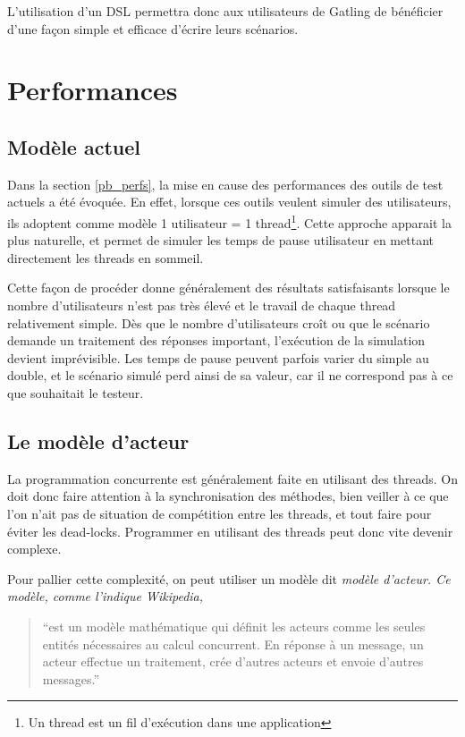 L'utilisation d'un DSL permettra donc aux utilisateurs de Gatling de bénéficier d'une façon simple et efficace d'écrire leurs scénarios.

\section{Performances}
\subsection{Modèle actuel}
Dans la section \ref{pb_perfs}, la mise en cause des performances des outils de test actuels a été évoquée. En effet, lorsque ces outils veulent simuler des utilisateurs, ils adoptent comme modèle 1 utilisateur = 1 thread\footnote{Un thread est un fil d'exécution dans une application}. Cette approche apparait la plus naturelle, et permet de simuler les temps de pause utilisateur en mettant directement les threads en sommeil.

Cette façon de procéder donne généralement des résultats satisfaisants lorsque le nombre d'utilisateurs n'est pas très élevé et le travail de chaque thread relativement simple. Dès que le nombre d'utilisateurs croît ou que le scénario demande un traitement des réponses important, l'exécution de la simulation devient imprévisible. Les temps de pause peuvent parfois varier du simple au double, et le scénario simulé perd ainsi de sa valeur, car il ne correspond pas à ce que souhaitait le testeur. 

\subsection{Le modèle d'acteur}
\label{sec_acteurs}
La programmation concurrente est généralement faite en utilisant des threads. On doit donc faire attention à la synchronisation des méthodes, bien veiller à ce que l'on n'ait pas de situation de compétition entre les threads, et tout faire pour éviter les dead-locks. Programmer en utilisant des threads peut donc vite devenir complexe.

Pour pallier cette complexité, on peut utiliser un modèle dit \em{modèle d'acteur}. Ce modèle, comme l'indique Wikipedia\cite{actor_model}, \begin{quote}``est un modèle mathématique qui définit les acteurs comme les seules entités nécessaires au calcul concurrent. En réponse à un message, un acteur effectue un traitement, crée d'autres acteurs et envoie d'autres messages.''\end{quote}

